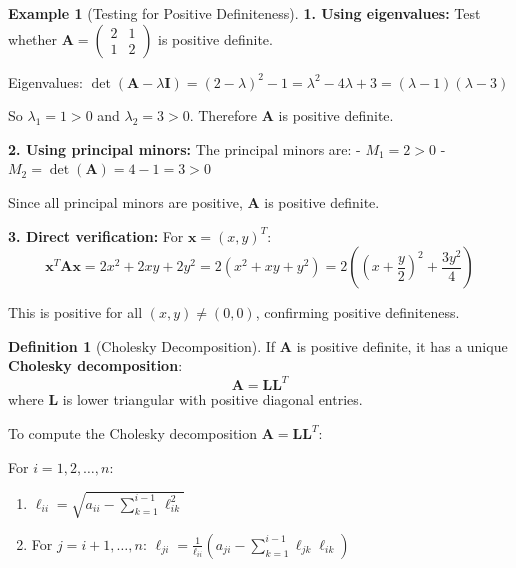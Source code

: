 \documentclass[12pt]{article}
\numberwithin{equation}{section}
\newcommand{\vect}[1]{\boldsymbol{#1}}   %
\newcommand{\mat}[1]{\mathbf{#1}}        %
\theoremstyle{plain}
\theoremstyle{definition}
\newtheorem{definition}[theorem]{Definition}
\newtheorem{example}[theorem]{Example}
\theoremstyle{remark}
\begin{document}
\begin{example}[Testing for Positive Definiteness]
\textbf{1. Using eigenvalues:}
Test whether $\mat{A} = \begin{pmatrix} 2 & 1 \\ 1 & 2 \end{pmatrix}$ is positive definite.

Eigenvalues: $\det(\mat{A} - \lambda\mat{I}) = (2-\lambda)^2 - 1 = \lambda^2 - 4\lambda + 3 = (\lambda-1)(\lambda-3)$

So $\lambda_1 = 1 > 0$ and $\lambda_2 = 3 > 0$. Therefore $\mat{A}$ is positive definite.

\textbf{2. Using principal minors:}
The principal minors are:
- $M_1 = 2 > 0$ \checkmark
- $M_2 = \det(\mat{A}) = 4 - 1 = 3 > 0$ \checkmark

Since all principal minors are positive, $\mat{A}$ is positive definite.

\textbf{3. Direct verification:}
For $\vect{x} = (x, y)^T$:
$$\vect{x}^T\mat{A}\vect{x} = 2x^2 + 2xy + 2y^2 = 2(x^2 + xy + y^2) = 2\left(\left(x + \frac{y}{2}\right)^2 + \frac{3y^2}{4}\right)$$

This is positive for all $(x, y) \neq (0, 0)$, confirming positive definiteness.
\end{example}

\begin{definition}[Cholesky Decomposition]
If $\mat{A}$ is positive definite, it has a unique \textbf{Cholesky decomposition}:
$$\mat{A} = \mat{L}\mat{L}^T$$
where $\mat{L}$ is lower triangular with positive diagonal entries.
\end{definition}

\begin{algorithm}[H]
\caption{Cholesky Algorithm}
To compute the Cholesky decomposition $\mat{A} = \mat{L}\mat{L}^T$:

For $i = 1, 2, \ldots, n$:
\begin{enumerate}
\item $\ell_{ii} = \sqrt{a_{ii} - \sum_{k=1}^{i-1} \ell_{ik}^2}$
\item For $j = i+1, \ldots, n$: $\ell_{ji} = \frac{1}{\ell_{ii}}\left(a_{ji} - \sum_{k=1}^{i-1} \ell_{jk}\ell_{ik}\right)$
\end{enumerate}
\end{algorithm}
\end{document}
